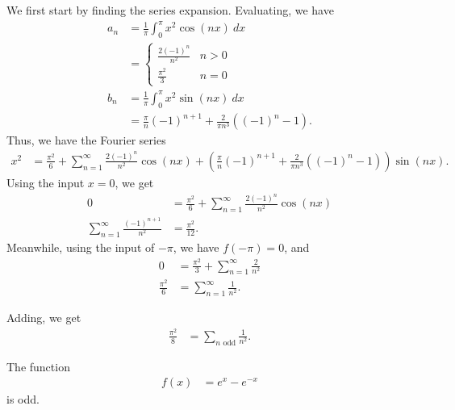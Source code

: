 \documentclass[10pt]{mypackage}
\begin{document}
\begin{solution}[11.2, Problem 17]
  We first start by finding the series expansion. Evaluating, we have
  \begin{align*}
    a_n &= \frac{1}{\pi} \int_{0}^{\pi} x^2\cos\left( nx \right)\:dx\\
        &= 
        \begin{cases}
          \frac{2\left( -1 \right)^{n}}{n^2} & n > 0\\
          \frac{\pi^2}{3} & n = 0
        \end{cases}\\
    b_n &= \frac{1}{\pi} \int_{0}^{\pi} x^2\sin\left( nx \right)\:dx\\
        &= \frac{\pi}{n}\left( -1 \right)^{n+1} + \frac{2}{\pi n^3}\left( \left( -1 \right)^{n} - 1 \right).
  \end{align*}
  Thus, we have the Fourier series
  \begin{align*}
    x^2 &= \frac{\pi^2}{6} + \sum_{n=1}^{\infty}\frac{2\left( -1 \right)^{n}}{n^2}\cos\left( nx \right) + \left( \frac{\pi}{n}\left( -1 \right)^{n+1} + \frac{2}{\pi n^3}\left( \left( -1 \right)^{n} - 1 \right) \right)\sin\left( nx \right).
  \end{align*}
  Using the input $x = 0$, we get
  \begin{align*}
    0 &= \frac{\pi^2}{6} + \sum_{n=1}^{\infty}\frac{2\left( -1 \right)^{n}}{n^2}\cos\left( nx \right)\\
    \sum_{n=1}^{\infty}\frac{\left( -1 \right)^{n+1}}{n^2} &= \frac{\pi^2}{12}.
  \end{align*}
  Meanwhile, using the input of $-\pi$, we have $f(-\pi) = 0$, and
  \begin{align*}
    0 &= \frac{\pi^2}{3} + \sum_{n=1}^{\infty} \frac{2}{n^2}\\
    \frac{\pi^2}{6} &= \sum_{n=1}^{\infty}\frac{1}{n^2}.
  \end{align*}
\end{solution}
\begin{solution}[11.2, Problem 18]
  Adding, we get
  \begin{align*}
    \frac{\pi^2}{8} &= \sum_{n\text{ odd}} \frac{1}{n^2}.
  \end{align*}
\end{solution}
\begin{solution}[11.3, Problem 6]
  The function
  \begin{align*}
    f(x) &= e^{x} - e^{-x}
  \end{align*}
  is odd.
\end{solution}
\end{document}
